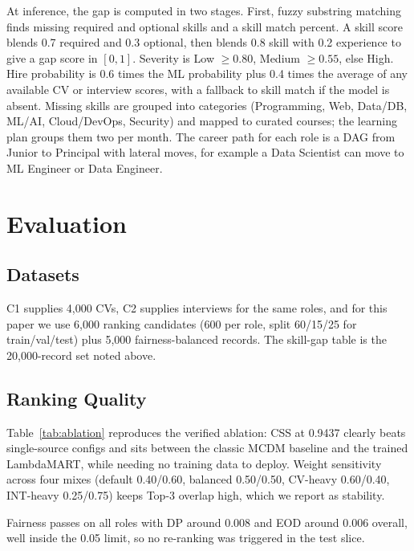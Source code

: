 \documentclass[conference]{IEEEtran}
\begin{document}
At inference, the gap is computed in two stages. First, fuzzy substring matching finds missing required and optional skills and a skill match percent. A skill score blends 0.7 required and 0.3 optional, then blends 0.8 skill with 0.2 experience to give a gap score in $[0, 1]$. Severity is Low $\ge 0.80$, Medium $\ge 0.55$, else High. Hire probability is 0.6 times the ML probability plus 0.4 times the average of any available CV or interview scores, with a fallback to skill match if the model is absent. Missing skills are grouped into categories (Programming, Web, Data/DB, ML/AI, Cloud/DevOps, Security) and mapped to curated courses; the learning plan groups them two per month. The career path for each role is a DAG from Junior to Principal with lateral moves, for example a Data Scientist can move to ML Engineer or Data Engineer.

\section{Evaluation}

\subsection{Datasets}
C1 supplies 4,000 CVs, C2 supplies interviews for the same roles, and for this paper we use 6,000 ranking candidates (600 per role, split 60/15/25 for train/val/test) plus 5,000 fairness-balanced records. The skill-gap table is the 20,000-record set noted above.

\subsection{Ranking Quality}
Table~\ref{tab:ablation} reproduces the verified ablation: CSS at 0.9437 clearly beats single-source configs and sits between the classic MCDM baseline and the trained LambdaMART, while needing no training data to deploy. Weight sensitivity across four mixes (default 0.40/0.60, balanced 0.50/0.50, CV-heavy 0.60/0.40, INT-heavy 0.25/0.75) keeps Top-3 overlap high, which we report as stability.

Fairness passes on all roles with DP around 0.008 and EOD around 0.006 overall, well inside the 0.05 limit, so no re-ranking was triggered in the test slice.
\end{document}
